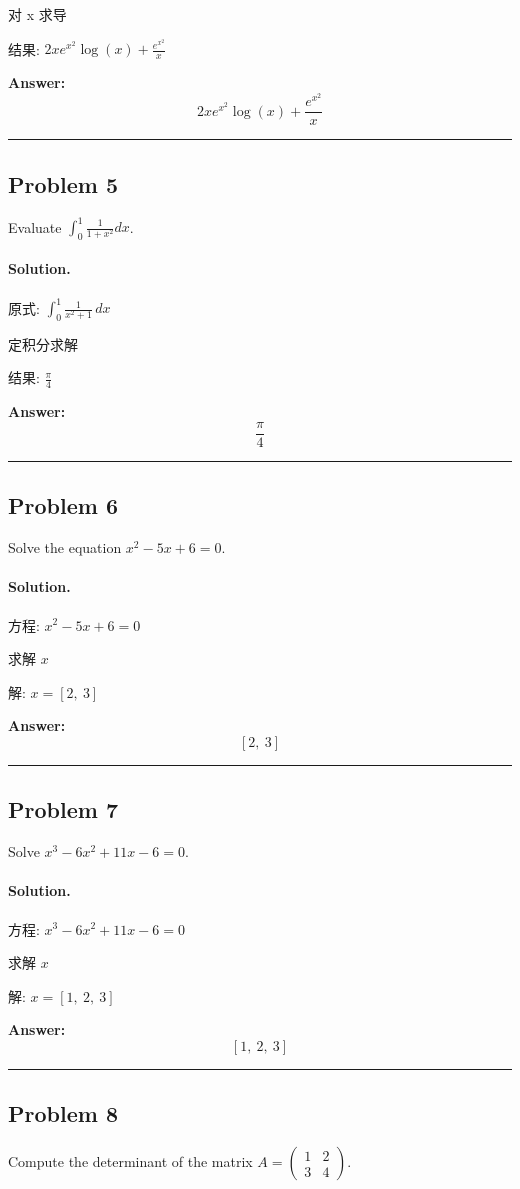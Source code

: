 \documentclass[12pt, a4paper]{article}
\newcommand{\problem}[1]{\subsection*{Problem #1}}
\newcommand{\solution}{\paragraph{Solution.}}
\begin{document}
对 x 求导

结果: $2 x e^{x^{2}} \log{\left(x \right)} + \frac{e^{x^{2}}}{x}$

\textbf{Answer:}
\[\boxed{2 x e^{x^{2}} \log{\left(x \right)} + \frac{e^{x^{2}}}{x}}\]

\vspace{1em}
\hrule
\vspace{1em}

\problem{5}

Evaluate $\int_0^1 \frac{1}{1+x^2} dx$.

\solution

原式: $\int_{0}^{1} \frac{1}{x^{2} + 1} \, dx$

定积分求解

结果: $\frac{\pi}{4}$

\textbf{Answer:}
\[\boxed{\frac{\pi}{4}}\]

\vspace{1em}
\hrule
\vspace{1em}

\problem{6}

Solve the equation $x^2 - 5x + 6 = 0$.

\solution

方程: $x^{2} - 5 x + 6 = 0$

求解 $x$

解: $x = \left[ 2, \  3\right]$

\textbf{Answer:}
\[\boxed{\left[ 2, \  3\right]}\]

\vspace{1em}
\hrule
\vspace{1em}

\problem{7}

Solve $x^3 - 6x^2 + 11x - 6 = 0$.

\solution

方程: $x^{3} - 6 x^{2} + 11 x - 6 = 0$

求解 $x$

解: $x = \left[ 1, \  2, \  3\right]$

\textbf{Answer:}
\[\boxed{\left[ 1, \  2, \  3\right]}\]

\vspace{1em}
\hrule
\vspace{1em}

\problem{8}

Compute the determinant of the matrix $A = \begin{pmatrix} 1 & 2 \\ 3 & 4 \end{pmatrix}$.
\end{document}
